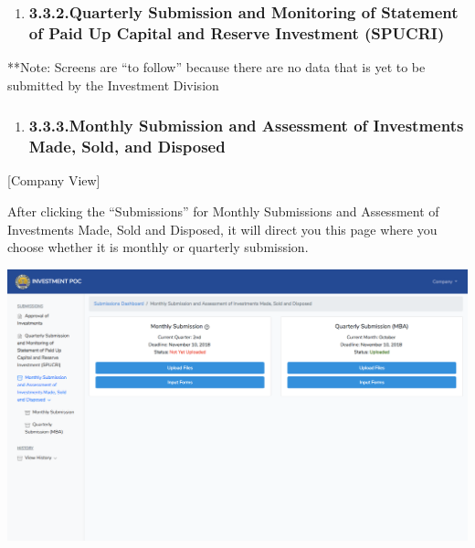 \documentclass{article}
\begin{document}
\begin{enumerate}[noitemsep,topsep=\mdcompacttopsep]%

\item{}
\subsubsection{3.3.2.\hspace*{0.5em}Quarterly Submission and Monitoring of Statement of Paid Up Capital and Reserve Investment (SPUCRI)}\label{sec-quarterly-submission-and-monitoring-of-statement-of-paid-up-capital-and-reserve-investment-spucri}%
\end{enumerate}%

\noindent{}**Note: Screens are “to follow” because there are no
data that is yet to be submitted by the Investment Division%

\begin{enumerate}[noitemsep,topsep=\mdcompacttopsep]%

\item{}
\subsubsection{3.3.3.\hspace*{0.5em}Monthly Submission and Assessment of Investments Made, Sold, and Disposed}\label{sec-monthly-submission-and-assessment-of-investments-made-sold-and-disposed}%
\end{enumerate}%

\noindent{}[Company View]%

After clicking the “Submissions” for Monthly Submissions and
Assessment of Investments Made, Sold and Disposed, it will direct you
this page where you choose whether it is monthly or quarterly
submission.%

\includegraphics[keepaspectratio=true]{up-ic-screens/image86}{}%
\end{document}
